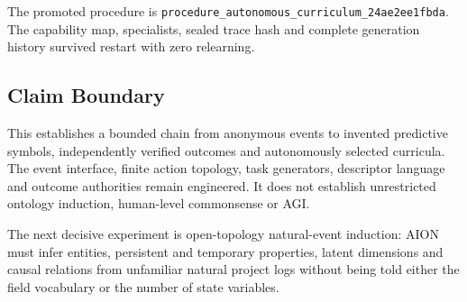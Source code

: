 The promoted procedure is
\texttt{procedure\_autonomous\_curriculum\_24ae2ee1fbda}.
The capability map, specialists, sealed trace hash and complete generation
history survived restart with zero relearning.

\subsection{Claim Boundary}

This establishes a bounded chain from anonymous events to invented predictive
symbols, independently verified outcomes and autonomously selected curricula.
The event interface, finite action topology, task generators, descriptor
language and outcome authorities remain engineered.  It does not establish
unrestricted ontology induction, human-level commonsense or AGI.

The next decisive experiment is open-topology natural-event induction:
AION must infer entities, persistent and temporary properties, latent
dimensions and causal relations from unfamiliar natural project logs without
being told either the field vocabulary or the number of state variables.
